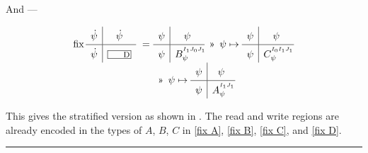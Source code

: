\medskip\noindent
And ---

\begin{equation}
  \begin{array}{@{} l @{} l @{}}
    \fix\quadrants{\dot\psi}{\dot\psi}{\dot\psi}{\lbox D} ~=~ &
      \quadrants{\psi}{\psi}{\psi}{B^{^{I_1J_0J_1}}_\psi\!\!\!\!} ~\applt~
      \psi\mapsto\quadrants{\psi}{\psi}{\psi}{C^{^{I_0I_1J_1}}_\psi\!\!\!} \\
    &
       ~\applt~ \psi\mapsto\quadrants{\psi}{\psi}{\psi}{A^{^{I_1J_1}}_\psi\!\!\!}
  \end{array}
  \label{fix D}
\end{equation}

This gives the stratified version as shown in .
The read and write regions are already encoded in the types of $A$, $B$, $C$ in 
\eqref{fix A}, \eqref{fix B}, \eqref{fix C}, and \eqref{fix D}.

\medskip
\hrule
\bigskip

